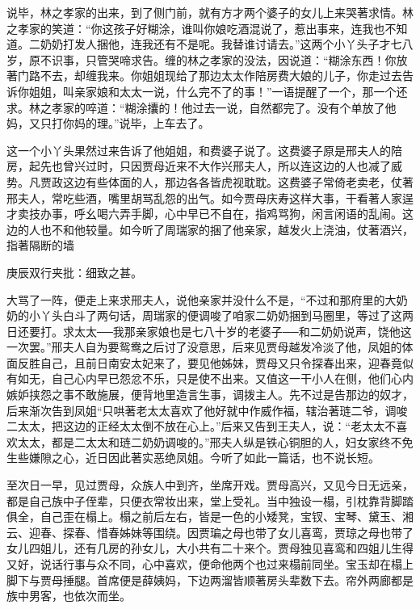 \begin{parag}
    说毕，林之孝家的出来，到了侧门前，就有方才两个婆子的女儿上来哭著求情。林之孝家的笑道：“你这孩子好糊涂，谁叫你娘吃酒混说了，惹出事来，连我也不知道。二奶奶打发人捆他，连我还有不是呢。我替谁讨请去。”这两个小丫头子才七八岁，原不识事，只管哭啼求告。缠的林之孝家的没法，因说道：“糊涂东西！你放著门路不去，却缠我来。你姐姐现给了那边太太作陪房费大娘的儿子，你走过去告诉你姐姐，叫亲家娘和太太一说，什么完不了的事！”一语提醒了一个，那一个还求。林之孝家的啐道：“糊涂攮的！他过去一说，自然都完了。没有个单放了他妈，又只打你妈的理。”说毕，上车去了。
\end{parag}


\begin{parag}
    这一个小丫头果然过来告诉了他姐姐，和费婆子说了。这费婆子原是邢夫人的陪房，起先也曾兴过时，只因贾母近来不大作兴邢夫人，所以连这边的人也减了威势。凡贾政这边有些体面的人，那边各各皆虎视耽耽。这费婆子常倚老卖老，仗著邢夫人，常吃些酒，嘴里胡骂乱怨的出气。如今贾母庆寿这样大事，干看著人家逞才卖技办事，呼幺喝六弄手脚，心中早已不自在，指鸡骂狗，闲言闲语的乱闹。这边的人也不和他较量。如今听了周瑞家的捆了他亲家，越发火上浇油，仗著酒兴，指著隔断的墙\begin{note}庚辰双行夹批：细致之甚。\end{note}大骂了一阵，便走上来求邢夫人，说他亲家并没什么不是，“不过和那府里的大奶奶的小丫头白斗了两句话，周瑞家的便调唆了咱家二奶奶捆到马圈里，等过了这两日还要打。求太太──我那亲家娘也是七八十岁的老婆子──和二奶奶说声，饶他这一次罢。”邢夫人自为要鸳鸯之后讨了没意思，后来见贾母越发冷淡了他，凤姐的体面反胜自己，且前日南安太妃来了，要见他姊妹，贾母又只令探春出来，迎春竟似有如无，自己心内早已怨忿不乐，只是使不出来。又值这一干小人在侧，他们心内嫉妒挟怨之事不敢施展，便背地里造言生事，调拨主人。先不过是告那边的奴才，后来渐次告到凤姐“只哄著老太太喜欢了他好就中作威作福，辖治著琏二爷，调唆二太太，把这边的正经太太倒不放在心上。”后来又告到王夫人，说：“老太太不喜欢太太，都是二太太和琏二奶奶调唆的。”邢夫人纵是铁心铜胆的人，妇女家终不免生些嫌隙之心，近日因此著实恶绝凤姐。今听了如此一篇话，也不说长短。
\end{parag}


\begin{parag}
    至次日一早，见过贾母，众族人中到齐，坐席开戏。贾母高兴，又见今日无远亲，都是自己族中子侄辈，只便衣常妆出来，堂上受礼。当中独设一榻，引枕靠背脚踏俱全，自己歪在榻上。榻之前后左右，皆是一色的小矮凳，宝钗、宝琴、黛玉、湘云、迎春、探春、惜春姊妹等围绕。因贾㻞之母也带了女儿喜鸾，贾琼之母也带了女儿四姐儿，还有几房的孙女儿，大小共有二十来个。贾母独见喜鸾和四姐儿生得又好，说话行事与众不同，心中喜欢，便命他两个也过来榻前同坐。宝玉却在榻上脚下与贾母捶腿。首席便是薛姨妈，下边两溜皆顺著房头辈数下去。帘外两廊都是族中男客，也依次而坐。
\end{parag}


